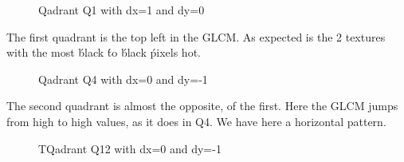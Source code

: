 \documentclass{article}
\begin{document}
	\begin{figure}[h!]%
		\centering
    	\caption{Qadrant Q1 with dx=1 and dy=0}%
    	\label{fig:o3_q1}%
	\end{figure}
The first quadrant is the top left in the GLCM. As expected is the 2 textures with the most \' black \' to \' black \' pixels hot.   
\newpage
	\begin{figure}[h!]%
		\centering
    	\caption{Qadrant Q4 with dx=0 and dy=-1}%
    	\label{fig:o3_q4}%
	\end{figure}
The second quadrant is almost the opposite, of the first. Here the GLCM jumps from high to high values, as it does in Q4. We have here a horizontal pattern. 
\newpage
	\begin{figure}[h!]%
		\centering
    	\caption{TQadrant Q12 with dx=0 and dy=-1}%
    	\label{fig:o3_q12}%
	\end{figure}
\end{document}

